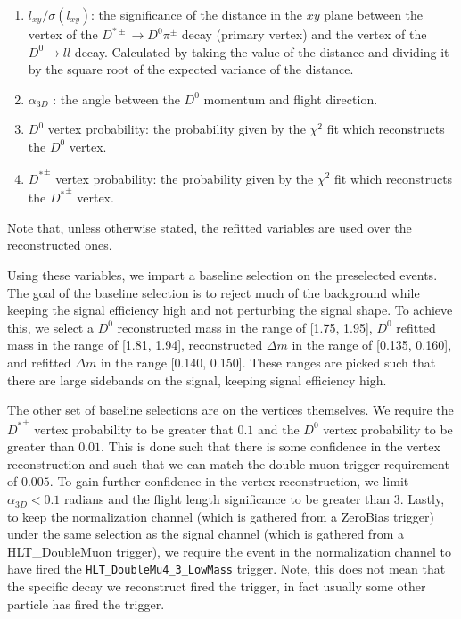 \begin{enumerate}
    \item $l_{xy}/\sigma\left(l_{xy}\right)$: the significance of the distance in the $xy$ plane between the vertex of the $D^{*\pm} \to D^0 \pi^\pm$ decay (primary vertex) and the vertex of the $D^0 \to l l$ decay. Calculated by taking the value of the distance and dividing it by the square root of the expected variance of the distance. 
    \item $\alpha_{3D}$ : the angle between the $D^0$ momentum and flight direction. 
    \item $D^0$ vertex probability: the probability given by the $\chi^2$ fit which reconstructs the $D^0$ vertex.
    \item ${D^*}^\pm$ vertex probability: the probability given by the $\chi^2$ fit which reconstructs the ${D^*}^\pm$ vertex.
\end{enumerate}
Note that, unless otherwise stated, the refitted variables are used over the reconstructed ones. 

Using these variables, we impart a baseline selection on the preselected events. The goal of the baseline selection is to reject much of the background while keeping the signal efficiency high and not perturbing the signal shape. To achieve this, we select a $D^0$ reconstructed mass in the range of [1.75, 1.95], $D^0$ refitted mass in the range of [1.81, 1.94], reconstructed $\Delta m$ in the range of [0.135, 0.160], and refitted $\Delta m$ in the range [0.140, 0.150]. These ranges are picked such that there are large sidebands on the signal, keeping signal efficiency high.

The other set of baseline selections are on the vertices themselves. We require the ${D^*}^\pm$ vertex probability to be greater that $0.1$ and the $D^0$ vertex probability to be greater than $0.01$. This is done such that there is some confidence in the vertex reconstruction and such that we can match the double muon trigger requirement of $0.005$. To gain further confidence in the vertex reconstruction, we limit $\alpha_{3D} < 0.1$ radians and the flight length significance to be greater than 3. Lastly, to keep the normalization channel (which is gathered from a ZeroBias trigger) under the same selection as the signal channel (which is gathered from a HLT\_DoubleMuon trigger), we require the event in the normalization channel to have fired the \texttt{HLT\_DoubleMu4\_3\_LowMass} trigger. Note, this does not mean that the specific decay we reconstruct fired the trigger, in fact usually some other particle has fired the trigger. 

